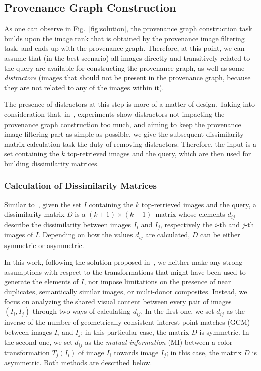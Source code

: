 \subsection{Provenance Graph Construction}
\label{sec:prop:graph_building}

As one can observe in Fig.~\ref{fig:solution}, the provenance graph construction task builds upon the image rank that is obtained by the provenance image filtering task, and ends up with the provenance graph.
Therefore, at this point, we can assume that (in the best scenario) all images directly and transitively related to the query are available for constructing the provenance graph, as well as some \emph{distractors} (images that should not be present in the provenance graph, because they are not related to any of the images within it).

The presence of distractors at this step is more of a matter of design.
Taking into consideration that, in~\cite{bharati2017uphy}, experiments show distractors not impacting the provenance graph construction too much, and aiming to keep the provenance image filtering part as simple as possible, we give the subsequent dissimilarity matrix calculation task the duty of removing distractors. Therefore, the input is a set containing the $k$ top-retrieved images and the query, which are then used for building dissimilarity matrices.

\vspace{0.2cm}
\subsubsection{Calculation of Dissimilarity Matrices}
\label{sec:prop_dismat}
Similar to~\cite{Dias_2012}, given the set $I$ containing the $k$ top-retrieved images and the query, a dissimilarity matrix $D$ is a $(k+1)\times(k+1)$~matrix whose elements $d_{ij}$ describe the dissimilarity between images $I_i$ and $I_j$, respectively the $i$-th and $j$-th images of $I$.
Depending on how the values $d_{ij}$ are calculated, $D$ can be either symmetric or asymmetric.

In this work, following the solution proposed in~\cite{bharati2017uphy}, we neither make any strong assumptions with respect to the transformations that might have been used to generate the elements of $I$, nor impose limitations on the presence of near duplicates, semantically similar images, or multi-donor composites.
Instead, we focus on analyzing the shared visual content between every pair of images $(I_i, I_j)$ through two ways of calculating $d_{ij}$.
In the first one, we set $d_{ij}$ as the inverse of the number of geometrically-consistent interest-point matches (GCM) between images $I_i$ and $I_j$; in this particular case, the matrix $D$ is symmetric.
In the second one, we set $d_{ij}$ as the \emph{mutual information} (MI) between a color transformation $T_j(I_i)$ of image $I_i$ towards image $I_j$; in this case, the matrix $D$ is asymmetric.
Both methods are described below.

